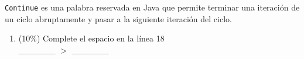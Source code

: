 \documentclass[twocolumn]{article}
\begin{document}
\texttt{Continue} es una palabra reservada en Java que permite terminar una iteración
de un ciclo abruptamente y pasar a la siguiente iteración del ciclo.\\

\begin{enumerate}[label=\Alph*]


    \item (10\%) Complete el espacio en la línea 18\\


  \_\_\_\_\_\_ $>$ \_\_\_\_\_\_

\end{enumerate}

\end{document}
